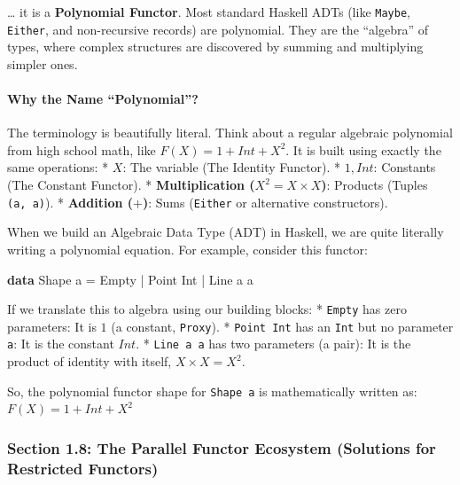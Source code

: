 \documentclass[
]{article}
\newenvironment{Shaded}{}{}
\newcommand{\DataTypeTok}[1]{\textcolor[rgb]{0.56,0.13,0.00}{#1}}
\newcommand{\KeywordTok}[1]{\textcolor[rgb]{0.00,0.44,0.13}{\textbf{#1}}}
\newcommand{\NormalTok}[1]{#1}
\newcommand{\OperatorTok}[1]{\textcolor[rgb]{0.40,0.40,0.40}{#1}}
\newcommand{\OtherTok}[1]{\textcolor[rgb]{0.00,0.44,0.13}{#1}}
\begin{document}
\ldots{} it is a \textbf{Polynomial Functor}. Most standard Haskell ADTs
(like \texttt{Maybe}, \texttt{Either}, and non-recursive records) are
polynomial. They are the ``algebra'' of types, where complex structures
are discovered by summing and multiplying simpler ones.

\paragraph{Why the Name ``Polynomial''?}\label{why-the-name-polynomial}

The terminology is beautifully literal. Think about a regular algebraic
polynomial from high school math, like \(F(X) = 1 + Int + X^2\). It is
built using exactly the same operations: * \textbf{\(X\)}: The variable
(The Identity Functor). * \textbf{\(1, Int\)}: Constants (The Constant
Functor). * \textbf{Multiplication (\(X^2 = X \times X\))}: Products
(Tuples \texttt{(a,\ a)}). * \textbf{Addition (\(+\))}: Sums
(\texttt{Either} or alternative constructors).

When we build an Algebraic Data Type (ADT) in Haskell, we are quite
literally writing a polynomial equation. For example, consider this
functor:

\begin{Shaded}
\begin{Highlighting}[]
\KeywordTok{data} \DataTypeTok{Shape}\NormalTok{ a }\OtherTok{=} \DataTypeTok{Empty} \OperatorTok{|} \DataTypeTok{Point} \DataTypeTok{Int} \OperatorTok{|} \DataTypeTok{Line}\NormalTok{ a a}
\end{Highlighting}
\end{Shaded}

If we translate this to algebra using our building blocks: *
\texttt{Empty} has zero parameters: It is \(1\) (a constant,
\texttt{Proxy}). * \texttt{Point\ Int} has an \texttt{Int} but no
parameter \texttt{a}: It is the constant \(Int\). * \texttt{Line\ a\ a}
has two parameters (a pair): It is the product of identity with itself,
\(X \times X = X^2\).

So, the polynomial functor shape for \texttt{Shape\ a} is mathematically
written as: \textbf{\(F(X) = 1 + Int + X^2\)}

\subsubsection{Section 1.8: The Parallel Functor Ecosystem (Solutions
for Restricted
Functors)}\label{section-1.8-the-parallel-functor-ecosystem-solutions-for-restricted-functors}
\end{document}
